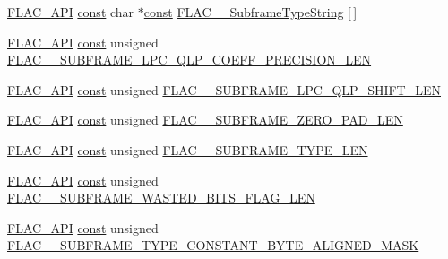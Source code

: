 \begin{DoxyCompactItemize}
\item 
\hyperlink{group__flac__export_ga56ca07df8a23310707732b1c0007d6f5}{F\+L\+A\+C\+\_\+\+A\+PI} \hyperlink{getopt1_8c_a2c212835823e3c54a8ab6d95c652660e}{const} char $\ast$\hyperlink{getopt1_8c_a2c212835823e3c54a8ab6d95c652660e}{const} \hyperlink{group__flac__format_gabc358f252630dfc52e875eb05c3b0fd9}{F\+L\+A\+C\+\_\+\+\_\+\+Subframe\+Type\+String} \mbox{[}$\,$\mbox{]}
\item 
\hyperlink{group__flac__export_ga56ca07df8a23310707732b1c0007d6f5}{F\+L\+A\+C\+\_\+\+A\+PI} \hyperlink{getopt1_8c_a2c212835823e3c54a8ab6d95c652660e}{const} unsigned \hyperlink{group__flac__format_ga1d983d775b492e968719457694737116}{F\+L\+A\+C\+\_\+\+\_\+\+S\+U\+B\+F\+R\+A\+M\+E\+\_\+\+L\+P\+C\+\_\+\+Q\+L\+P\+\_\+\+C\+O\+E\+F\+F\+\_\+\+P\+R\+E\+C\+I\+S\+I\+O\+N\+\_\+\+L\+EN}
\item 
\hyperlink{group__flac__export_ga56ca07df8a23310707732b1c0007d6f5}{F\+L\+A\+C\+\_\+\+A\+PI} \hyperlink{getopt1_8c_a2c212835823e3c54a8ab6d95c652660e}{const} unsigned \hyperlink{group__flac__format_ga07ee16744f0933eaa665cec8f2ec5631}{F\+L\+A\+C\+\_\+\+\_\+\+S\+U\+B\+F\+R\+A\+M\+E\+\_\+\+L\+P\+C\+\_\+\+Q\+L\+P\+\_\+\+S\+H\+I\+F\+T\+\_\+\+L\+EN}
\item 
\hyperlink{group__flac__export_ga56ca07df8a23310707732b1c0007d6f5}{F\+L\+A\+C\+\_\+\+A\+PI} \hyperlink{getopt1_8c_a2c212835823e3c54a8ab6d95c652660e}{const} unsigned \hyperlink{group__flac__format_ga11cc163e6aea53e590708bba61a01162}{F\+L\+A\+C\+\_\+\+\_\+\+S\+U\+B\+F\+R\+A\+M\+E\+\_\+\+Z\+E\+R\+O\+\_\+\+P\+A\+D\+\_\+\+L\+EN}
\item 
\hyperlink{group__flac__export_ga56ca07df8a23310707732b1c0007d6f5}{F\+L\+A\+C\+\_\+\+A\+PI} \hyperlink{getopt1_8c_a2c212835823e3c54a8ab6d95c652660e}{const} unsigned \hyperlink{group__flac__format_ga1b8b7ac39c55c0fc7973821cd4297104}{F\+L\+A\+C\+\_\+\+\_\+\+S\+U\+B\+F\+R\+A\+M\+E\+\_\+\+T\+Y\+P\+E\+\_\+\+L\+EN}
\item 
\hyperlink{group__flac__export_ga56ca07df8a23310707732b1c0007d6f5}{F\+L\+A\+C\+\_\+\+A\+PI} \hyperlink{getopt1_8c_a2c212835823e3c54a8ab6d95c652660e}{const} unsigned \hyperlink{group__flac__format_ga86d93adcc6b7f67eaecd19e5c3fbdfcf}{F\+L\+A\+C\+\_\+\+\_\+\+S\+U\+B\+F\+R\+A\+M\+E\+\_\+\+W\+A\+S\+T\+E\+D\+\_\+\+B\+I\+T\+S\+\_\+\+F\+L\+A\+G\+\_\+\+L\+EN}
\item 
\hyperlink{group__flac__export_ga56ca07df8a23310707732b1c0007d6f5}{F\+L\+A\+C\+\_\+\+A\+PI} \hyperlink{getopt1_8c_a2c212835823e3c54a8ab6d95c652660e}{const} unsigned \hyperlink{group__flac__format_gadbf7a91c50f42a246aa1db9bd61bac16}{F\+L\+A\+C\+\_\+\+\_\+\+S\+U\+B\+F\+R\+A\+M\+E\+\_\+\+T\+Y\+P\+E\+\_\+\+C\+O\+N\+S\+T\+A\+N\+T\+\_\+\+B\+Y\+T\+E\+\_\+\+A\+L\+I\+G\+N\+E\+D\+\_\+\+M\+A\+SK}

\end{DoxyCompactItemize}
